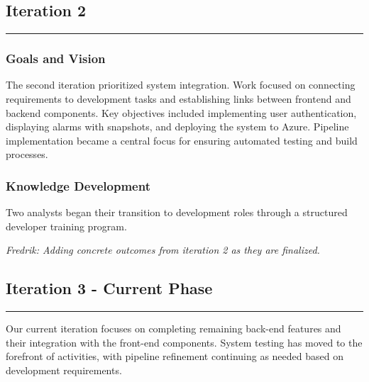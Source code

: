 \subsection{Iteration 2}
\noindent\rule{\textwidth}{0.4pt}

\subsubsection*{Goals and Vision}
The second iteration prioritized system integration. Work focused on connecting requirements to development tasks and establishing links between frontend and backend components. Key objectives included implementing user authentication, displaying alarms with snapshots, and deploying the system to Azure. Pipeline implementation became a central focus for ensuring automated testing and build processes.

\begin{center}
\noindent{}
\end{center}

\subsubsection*{Knowledge Development}
Two analysts began their transition to development roles through a structured developer training program.

\textit{Fredrik: Adding concrete outcomes from iteration 2 as they are finalized.}

\subsection{Iteration 3 - Current Phase}
\noindent\rule{\textwidth}{0.4pt}

Our current iteration focuses on completing remaining back-end features and their integration with the front-end components. System testing has moved to the forefront of activities, with pipeline refinement continuing as needed based on development requirements.

